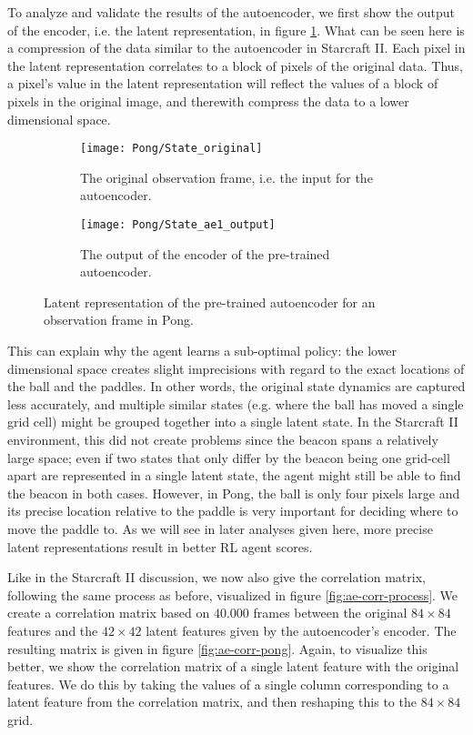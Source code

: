 To analyze and validate the results of the autoencoder, we first show the output of the encoder, i.e. the latent representation, in figure \ref{fig:ae-output-pong-pre}. What can be seen here is a compression of the data similar to the autoencoder in Starcraft II. Each pixel in the latent representation correlates to a block of pixels of the original data. Thus, a pixel's value in the latent representation will reflect the values of a block of pixels in the original image, and therewith compress the data to a lower dimensional space. 

\begin{figure}[h]
	\centering
	\begin{subfigure}[b]{0.40\textwidth}
		\texttt{[image: Pong/State\_original]}
		\caption{The original observation frame, i.e. the input for the autoencoder.}
	\end{subfigure}\hfill
	\begin{subfigure}[b]{0.40\textwidth}
		\texttt{[image: Pong/State\_ae1\_output]}
		\caption{The output of the encoder of the pre-trained autoencoder.}
		\medskip
	\end{subfigure}
	\caption{Latent representation of the pre-trained autoencoder for an observation frame in Pong.}
	\label{fig:ae-output-pong-pre}
\end{figure}

This can explain why the agent learns a sub-optimal policy: the lower dimensional space creates slight imprecisions with regard to the exact locations of the ball and the paddles. In other words, the original state dynamics are captured less accurately, and multiple similar states (e.g. where the ball has moved a single grid cell) might be grouped together into a single latent state. In the Starcraft II environment, this did not create problems since the beacon spans a relatively large space; even if two states that only differ by the beacon being one grid-cell apart are represented in a single latent state, the agent might still be able to find the beacon in both cases. However, in Pong, the ball is only four pixels large and its precise location relative to the paddle is very important for deciding where to move the paddle to. As we will see in later analyses given here, more precise latent representations result in better RL agent scores.

Like in the Starcraft II discussion, we now also give the correlation matrix, following the same process as before, visualized in figure \ref{fig:ae-corr-process}. We create a correlation matrix based on $40.000$ frames between the original $84 \times 84$ features and the $42 \times 42$ latent features given by the autoencoder's encoder. The resulting matrix is given in figure \ref{fig:ae-corr-pong}. Again, to visualize this better, we show the correlation matrix of a single latent feature with the original features. We do this by taking the values of a single column corresponding to a latent feature from the correlation matrix, and then reshaping this to the $84 \times 84$ grid.

